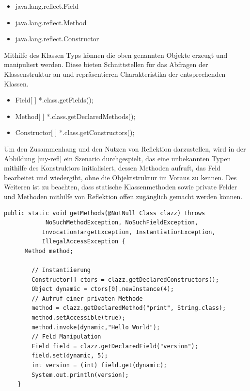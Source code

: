   \begin{itemize}
    \item java.lang.reflect.Field
    \item java.lang.reflect.Method
    \item java.lang.reflect.Constructor
  \end{itemize}

  Mithilfe des Klassen Typs können die oben genannten Objekte erzeugt und manipuliert werden. Diese bieten Schnittstellen für das Abfragen der Klassenstruktur an und repräsentieren Charakteristika der entsprechenden Klassen.

  \begin{itemize}
    \item Field[ ] *.class.getFields();
    \item Method[ ] *.class.getDeclaredMethods();
    \item Constructor[ ] *.class.getConstructors();
  \end{itemize}
  \bigbreak 

  Um den Zusammenhang und den Nutzen von Reflektion darzustellen, wird in der Abbildung \ref{my-refl} ein Szenario durchgespielt, das eine unbekannten Typen mithilfe des Konstruktors initialisiert, dessen Methoden aufruft, das Feld bearbeitet und wiedergibt, ohne die Objektstruktur im Voraus zu kennen. Des Weiteren ist zu beachten, dass statische Klassenmethoden sowie private Felder und Methoden mithilfe von Reflektion offen zugänglich gemacht werden können.\cite{Forman04javareflection}\bigbreak 

  \begin{lstlisting}[caption=Reflektion in Aktion,label=my-refl,captionpos=b]
    public static void getMethods(@NotNull Class clazz) throws
            NoSuchMethodException, NoSuchFieldException,
           InvocationTargetException, InstantiationException,
           IllegalAccessException {
      Method method;

        // Instantiierung
        Constructor[] ctors = clazz.getDeclaredConstructors();
        Object dynamic = ctors[0].newInstance(4);
        // Aufruf einer privaten Methode
        method = clazz.getDeclaredMethod("print", String.class);
        method.setAccessible(true);
        method.invoke(dynamic,"Hello World");
        // Feld Manipulation
        Field field = clazz.getDeclaredField("version");
        field.set(dynamic, 5);
        int version = (int) field.get(dynamic);
        System.out.println(version);
    }
  \end{lstlisting}

